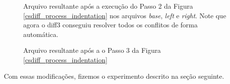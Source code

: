 \begin{figure}[ht]
	\begin{center}
		
		\caption{Arquivo resultante após a execução do Passo 2 da Figura \ref{csdiff_process_indentation} nos arquivos
			\emph{base}, \emph{left} e \emph{right}. Note que agora o diff3 conseguiu resolver todos
			os conflitos de forma automática.
		}\label{diff3_marcadores_indentacao}
	\end{center}
\end{figure}

\begin{figure}[ht]
	\begin{center}
        
		\caption{Arquivo resultante após a o Passo 3 da Figura
			\ref{csdiff_process_indentation}}\label{csdiff_indentacao}
	\end{center}
\end{figure}

Com essas modificações, fizemos o experimento descrito na seção seguinte.




